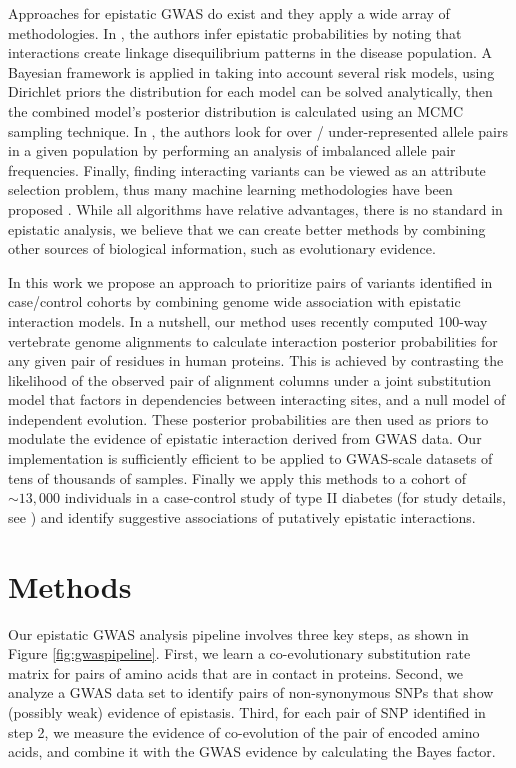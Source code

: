 Approaches for epistatic GWAS do exist and they apply a wide array of methodologies. In \cite{zhao2006test}, the authors infer epistatic probabilities by noting that interactions create linkage disequilibrium patterns in the disease population. A Bayesian framework is applied in \cite{zhang2007bayesian} taking into account several risk models, using Dirichlet priors the distribution for each model can be solved analytically, then the combined model's posterior distribution is calculated using an MCMC sampling technique. In \cite{ackermann2012systematic}, the authors look for over / under-represented allele pairs in a given population by performing an analysis of imbalanced allele pair frequencies. Finally, finding interacting variants can be viewed as an attribute selection problem, thus many machine learning methodologies have been proposed \cite{mckinney2006machine}. While all algorithms have relative advantages, there is no standard in epistatic analysis, we believe that we can create better methods by combining other sources of biological information, such as evolutionary evidence.

In this work we propose an approach to prioritize pairs of variants identified in case/control cohorts by combining genome wide association with epistatic interaction models. In a nutshell, our method uses recently computed 100-way vertebrate genome alignments \cite{blanchette2004aligning} to calculate interaction posterior probabilities for any given pair of residues in human proteins. This is achieved by contrasting the likelihood of the observed pair of alignment columns under a joint substitution model that factors in dependencies between interacting sites, and a null model of independent evolution.  These posterior probabilities are then used as priors to modulate the evidence of epistatic interaction derived from GWAS data. Our implementation is sufficiently efficient to be applied to GWAS-scale datasets of tens of thousands of samples. Finally we apply this methods to a cohort of $\sim 13,000$ individuals in a case-control study of type II diabetes (for study details, see \cite{mccarthy2015T2D}) and identify suggestive associations of putatively epistatic interactions.

\section{Methods \label{sec:gwasMeth}}

Our epistatic GWAS analysis pipeline involves three key steps, as shown in Figure \ref{fig:gwaspipeline}. First, we learn a co-evolutionary substitution rate matrix for pairs of amino acids that are in contact in proteins. Second, we analyze a GWAS data set to identify pairs of non-synonymous SNPs that show (possibly weak) evidence of epistasis. Third, for each pair of SNP identified in step 2, we measure the evidence of co-evolution of the pair of encoded amino acids, and combine it with the GWAS evidence by calculating the Bayes factor.

